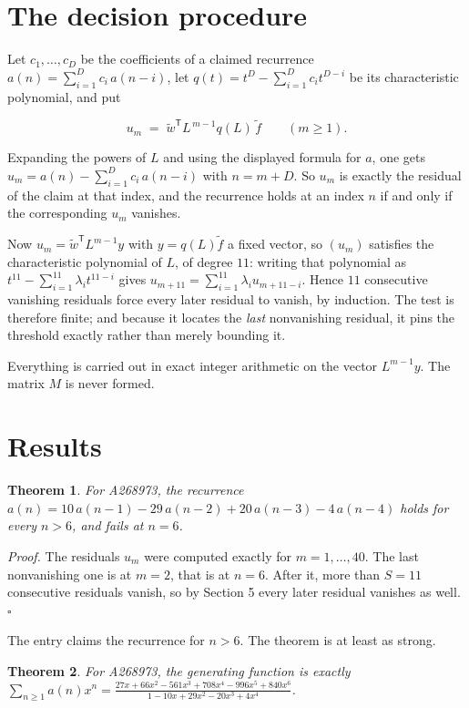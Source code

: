 \documentclass[11pt]{article}
\newtheorem{theorem}{Theorem}
\theoremstyle{definition}
\begin{document}
\section{The decision procedure}

Let $c_1,\dots,c_D$ be the coefficients of a claimed recurrence $a(n) = \sum_{i=1}^{D} c_i\,a(n-i)$, let $q(t) = t^{D} - \sum_{i=1}^{D} c_i t^{D-i}$ be its characteristic polynomial, and put

\[u_m \;=\; \tilde w^{\mathsf T} L^{\,m-1} q(L)\,\tilde f \qquad (m \ge 1).\]

Expanding the powers of $L$ and using the displayed formula for $a$, one gets $u_m = a(n) - \sum_{i=1}^{D} c_i\,a(n-i)$ with $n = m + D$. So $u_m$ is exactly the residual of the claim at that index, and the recurrence holds at an index $n$ if and only if the corresponding $u_m$ vanishes.

Now $u_m = \tilde w^{\mathsf T} L^{m-1} y$ with $y = q(L)\tilde f$ a fixed vector, so $(u_m)$ satisfies the characteristic polynomial of $L$, of degree $11$: writing that polynomial as $t^{11} - \sum_{i=1}^{11} \lambda_i t^{11-i}$ gives $u_{m+11} = \sum_{i=1}^{11} \lambda_i u_{m+11-i}$. Hence $11$ consecutive vanishing residuals force every later residual to vanish, by induction. The test is therefore finite; and because it locates the {\itshape last} nonvanishing residual, it pins the threshold exactly rather than merely bounding it.

Everything is carried out in exact integer arithmetic on the vector $L^{m-1}y$. The matrix $M$ is never formed.

\section{Results}

\begin{theorem} For A268973, the recurrence $a(n) = 10\,a(n-1) - 29\,a(n-2) + 20\,a(n-3) - 4\,a(n-4)$ holds for every $n > 6$, and fails at $n = 6$.\end{theorem}

{\itshape Proof.} The residuals $u_m$ were computed exactly for $m = 1,\dots,40$. The last nonvanishing one is at $m = 2$, that is at $n = 6$. After it, more than $S = 11$ consecutive residuals vanish, so by Section 5 every later residual vanishes as well. $\square$

The entry claims the recurrence for $n > 6$. The theorem is at least as strong.

\begin{theorem} For A268973, the generating function is exactly $\sum_{n\ge 1} a(n)x^n = \frac{27x + 66x^{2} - 561x^{3} + 708x^{4} - 996x^{5} + 840x^{6}}{1 - 10x + 29x^{2} - 20x^{3} + 4x^{4}}$.\end{theorem}
\end{document}
